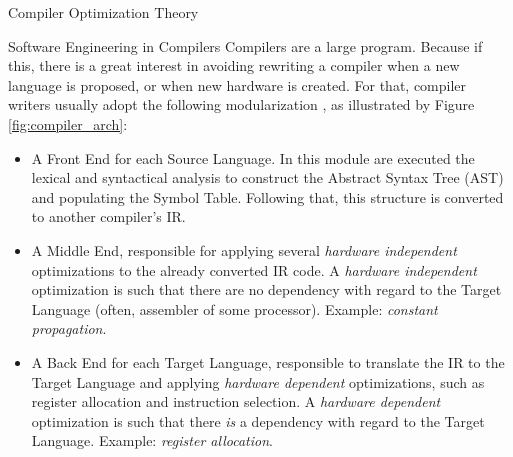 \begin{section}{Compiler Optimization Theory}
\begin{section}{Software Engineering in Compilers}
Compilers are a large program. Because if this, there is a great interest in
avoiding rewriting a compiler when a new language is proposed, or when new
hardware is created. For that, compiler writers usually adopt the following
modularization \citep{redhat} \citep{llvm}, as illustrated by Figure
\ref{fig:compiler_arch}:

%

\begin{itemize}

\item A Front End for each Source Language. In this module are executed the
lexical and syntactical analysis to construct the Abstract Syntax Tree (AST)
and populating the Symbol Table. Following that, this structure is converted to
another compiler's IR.

\item A Middle End, responsible for applying several \textit{hardware independent}
optimizations to the already converted IR code. A \textit{hardware independent}
optimization is such that there are no dependency with regard to the Target
Language (often, assembler of some processor). Example: \textit{constant propagation}.

\item A Back End for each Target Language, responsible to translate the IR to
the Target Language and applying \textit{hardware dependent} optimizations,
such as register allocation and instruction selection. A \textit{hardware dependent}
optimization is such that there \textit{is} a dependency with regard to the
Target Language. Example: \textit{register allocation}.

\end{itemize}

%
%


\end{section}
\end{section}
